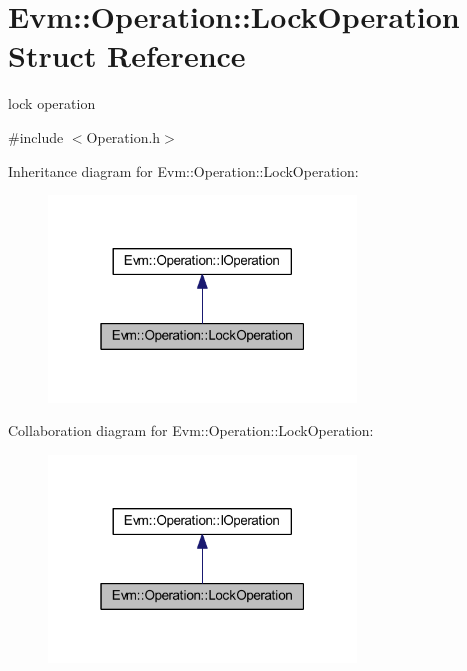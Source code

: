 \hypertarget{struct_evm_1_1_operation_1_1_lock_operation}{}\section{Evm\+:\+:Operation\+:\+:Lock\+Operation Struct Reference}
\label{struct_evm_1_1_operation_1_1_lock_operation}


lock operation  




{\ttfamily \#include $<$Operation.\+h$>$}



Inheritance diagram for Evm\+:\+:Operation\+:\+:Lock\+Operation\+:
\nopagebreak
\begin{figure}[H]
\begin{center}
\leavevmode
\includegraphics[width=232pt]{struct_evm_1_1_operation_1_1_lock_operation__inherit__graph}
\end{center}
\end{figure}


Collaboration diagram for Evm\+:\+:Operation\+:\+:Lock\+Operation\+:
\nopagebreak
\begin{figure}[H]
\begin{center}
\leavevmode
\includegraphics[width=232pt]{struct_evm_1_1_operation_1_1_lock_operation__coll__graph}
\end{center}
\end{figure}
